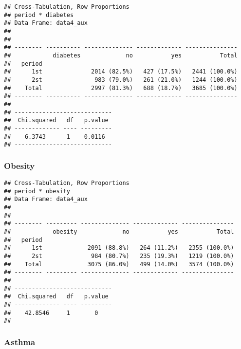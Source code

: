 \documentclass[
]{article}
\newenvironment{Shaded}{\begin{snugshade}}{\end{snugshade}}
\newcommand{\DataTypeTok}[1]{\textcolor[rgb]{0.13,0.29,0.53}{#1}}
\newcommand{\KeywordTok}[1]{\textcolor[rgb]{0.13,0.29,0.53}{\textbf{#1}}}
\newcommand{\NormalTok}[1]{#1}
\newcommand{\OperatorTok}[1]{\textcolor[rgb]{0.81,0.36,0.00}{\textbf{#1}}}
\newcommand{\OtherTok}[1]{\textcolor[rgb]{0.56,0.35,0.01}{#1}}
\newcommand{\StringTok}[1]{\textcolor[rgb]{0.31,0.60,0.02}{#1}}
\begin{document}
\begin{verbatim}
## Cross-Tabulation, Row Proportions  
## period * diabetes  
## Data Frame: data4_aux  
## 
## 
## -------- ---------- -------------- ------------- ---------------
##            diabetes             no           yes           Total
##   period                                                        
##      1st              2014 (82.5%)   427 (17.5%)   2441 (100.0%)
##      2st               983 (79.0%)   261 (21.0%)   1244 (100.0%)
##    Total              2997 (81.3%)   688 (18.7%)   3685 (100.0%)
## -------- ---------- -------------- ------------- ---------------
## 
## ----------------------------
##  Chi.squared   df   p.value 
## ------------- ---- ---------
##    6.3743      1    0.0116  
## ----------------------------
\end{verbatim}

\hypertarget{obesity-2}{%
\subsubsection{Obesity}\label{obesity-2}}

\begin{Shaded}
\end{Shaded}

\begin{verbatim}
## Cross-Tabulation, Row Proportions  
## period * obesity  
## Data Frame: data4_aux  
## 
## 
## -------- --------- -------------- ------------- ---------------
##            obesity             no           yes           Total
##   period                                                       
##      1st             2091 (88.8%)   264 (11.2%)   2355 (100.0%)
##      2st              984 (80.7%)   235 (19.3%)   1219 (100.0%)
##    Total             3075 (86.0%)   499 (14.0%)   3574 (100.0%)
## -------- --------- -------------- ------------- ---------------
## 
## ----------------------------
##  Chi.squared   df   p.value 
## ------------- ---- ---------
##    42.8546     1       0    
## ----------------------------
\end{verbatim}

\hypertarget{asthma-2}{%
\subsubsection{Asthma}\label{asthma-2}}
\end{document}
